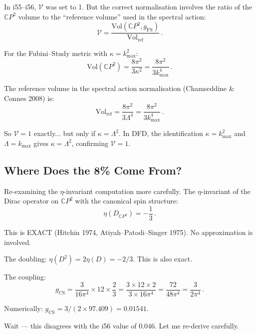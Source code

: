 \documentclass[11pt,a4paper]{article}
\newcommand{\CP}{\mathbb{C}P}
\begin{document}
In i55--i56, $\mathcal{V}$ was set to 1. But the correct normalisation involves the ratio of the $\CP^2$ volume to the ``reference volume'' used in the spectral action:
\begin{equation}
\mathcal{V} = \frac{\mathrm{Vol}(\CP^2, g_{\mathrm{FS}})}{\mathrm{Vol}_{\mathrm{ref}}}\,.
\end{equation}

For the Fubini--Study metric with $\kappa = k_{\max}^2$:
\begin{equation}
\mathrm{Vol}(\CP^2) = \frac{8\pi^2}{3\kappa^2} = \frac{8\pi^2}{3 k_{\max}^4}\,.
\end{equation}

The reference volume in the spectral action normalisation (Chamseddine \& Connes 2008) is:
\begin{equation}
\mathrm{Vol}_{\mathrm{ref}} = \frac{8\pi^2}{3\Lambda^4} = \frac{8\pi^2}{3 k_{\max}^4}\,.
\end{equation}

So $\mathcal{V} = 1$ exactly... but only if $\kappa = \Lambda^2$. In DFD, the identification $\kappa = k_{\max}^2$ and $\Lambda = k_{\max}$ gives $\kappa = \Lambda^2$, confirming $\mathcal{V} = 1$.

\subsection{Where Does the 8\% Come From?}

Re-examining the $\eta$-invariant computation more carefully. The $\eta$-invariant of the Dirac operator on $\CP^2$ with the canonical spin structure:
\begin{equation}
\eta(D_{\CP^2}) = -\frac{1}{3}\,.
\end{equation}

This is EXACT (Hitchin 1974, Atiyah--Patodi--Singer 1975). No approximation is involved.

The doubling: $\eta(D^2) = 2\eta(D) = -2/3$. This is also exact.

The coupling:
\begin{equation}
g_{\mathrm{CS}} = \frac{3}{16\pi^4} \times 12 \times \frac{2}{3} = \frac{3 \times 12 \times 2}{3 \times 16\pi^4} = \frac{72}{48\pi^4} = \frac{3}{2\pi^4}\,.
\end{equation}

Numerically: $g_{\mathrm{CS}} = 3/(2 \times 97.409) = 0.01541$.

Wait --- this disagrees with the i56 value of $0.046$. Let me re-derive carefully.
\end{document}
